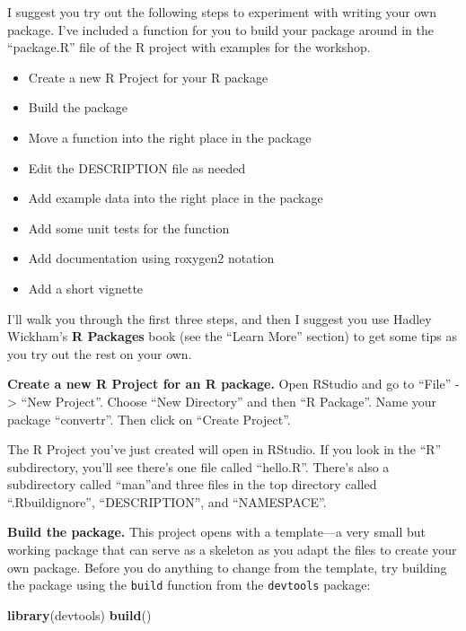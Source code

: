 \documentclass[]{tufte-book}
\newenvironment{Shaded}{}{}
\newcommand{\KeywordTok}[1]{\textcolor[rgb]{0.00,0.44,0.13}{\textbf{#1}}}
\newcommand{\NormalTok}[1]{#1}
\providecommand{\tightlist}{%
  \setlength{\itemsep}{0pt}\setlength{\parskip}{0pt}}
\begin{document}
I suggest you try out the following steps to experiment with
writing your own package. I've included a function for you to build
your package around in the ``package.R'' file of the R project with
examples for the workshop.

\begin{itemize}
\tightlist
\item
  Create a new R Project for your R package
\item
  Build the package
\item
  Move a function into the right place in the package
\item
  Edit the DESCRIPTION file as needed
\item
  Add example data into the right place in the package
\item
  Add some unit tests for the function
\item
  Add documentation using roxygen2 notation
\item
  Add a short vignette
\end{itemize}

I'll walk you through the first three steps, and then I suggest you use
Hadley Wickham's \textbf{R Packages} book (see the ``Learn More'' section) to
get some tips as you try out the rest on your own.

\textbf{Create a new R Project for an R package.} Open RStudio and go to ``File'' -\textgreater{}
``New Project''. Choose ``New Directory'' and then ``R Package''. Name your package
``convertr''. Then click on ``Create Project''.

The R Project you've just created will open in RStudio. If you look in the ``R''
subdirectory, you'll see there's one file called ``hello.R''. There's also a
subdirectory called ``man''and three files in the top directory called
``.Rbuildignore'', ``DESCRIPTION'', and ``NAMESPACE''.

\textbf{Build the package.} This project opens with a template---a very small but working package that can
serve as a skeleton as you adapt the files to create your own package. Before you
do anything to change from the template, try building the package using the
\texttt{build} function from the \texttt{devtools} package:

\begin{Shaded}
\begin{Highlighting}[]
\KeywordTok{library}\NormalTok{(devtools)}
\KeywordTok{build}\NormalTok{()}
\end{Highlighting}
\end{Shaded}
\end{document}
